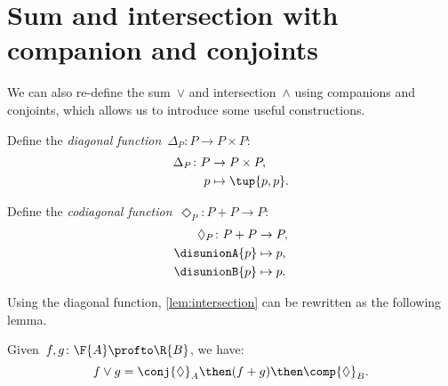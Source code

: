 \section{Sum and intersection with companion and conjoints}

We can also re-define the sum~$\vee$ and intersection~$\wedge$ using companions and conjoints, which allows us to introduce some useful constructions.

\begin{definition}
  Define the \emph{diagonal function}~$\Delta_P\colon P \to P \times P$:
  \begin{equation}
    \begin{aligned}
      \Delta_P \colon P & \to P \times P, \\
      p & \mapsto \tup{p, p}.
    \end{aligned}
  \end{equation}
\end{definition}

\begin{definition}
  Define the \emph{codiagonal function}~$\Diamond_P\colon P+P \to P $:
  \begin{equation}
    \begin{aligned}
      \Diamond_P \colon P + P & \to P,  \\
      \disunionA{p} & \mapsto p, \\
      \disunionB{p} & \mapsto p.
    \end{aligned}
  \end{equation}
\end{definition}

\noindent Using the diagonal function, \cref{lem:intersection} can be rewritten as the following lemma.

\begin{lemma}
  Given~$f, g\colon \F{A} \profto \R{B}$, we have:
  \begin{equation}
    f \vee g =  \conj{\Diamond}_A \then (f + g)\then \comp{\Diamond}_B.
  \end{equation}
\end{lemma}

